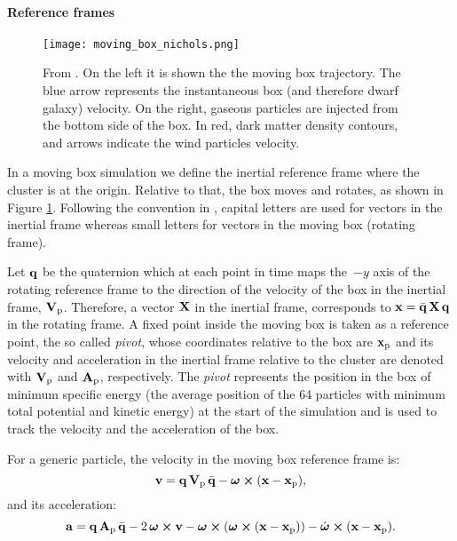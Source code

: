 \paragraph{Reference frames}
\begin{figure}[H]
 \centering
 \texttt{[image: moving\_box\_nichols.png]}
 \caption{From \citet{Nichols2015}. On the left it is shown the the moving box trajectory. The blue arrow represents the instantaneous box (and therefore dwarf galaxy) velocity.
 On the right, gaseous particles are injected from the bottom side of the box. In red, dark matter density contours, and arrows indicate the wind particles velocity.}
 \label{fig:mb_nichols}
\end{figure}
In a moving box simulation we define the inertial reference frame where the cluster is at the origin.
Relative to that, the box moves and rotates, as shown in Figure \ref{fig:mb_nichols}.
Following the convention in \citet{Nichols2015}, capital letters are used for vectors in the inertial frame whereas small letters for vectors in the moving box (rotating frame).

Let $\mathbf{q}$ be the quaternion which at each point in time maps the~$-y$ axis of the rotating reference frame to the direction of the velocity of the box in the inertial frame, $\boldsymbol{\mathbf{V}}_{\mathrm p}$.
Therefore, a vector $\boldsymbol{\mathbf{X}}$ in the inertial frame, corresponds to $\boldsymbol{\mathbf{x}} = \bar{\mathbf{q}}\, \boldsymbol{\mathbf{X}} \,\mathbf{q} $ in the rotating frame.
A fixed point inside the moving box is taken as a reference point, the so called \emph{pivot}, whose coordinates relative to the box are $\boldsymbol{\mathbf{x}}_{\mathrm p}$ and its velocity and acceleration in the inertial frame relative to the cluster are denoted with $\boldsymbol{\mathbf{V}}_{\mathrm p}$ and $\boldsymbol{\mathbf{A}}_{\mathrm p}$, respectively.
The \emph{pivot} represents the position in the box of minimum specific energy (the average position of the 64 particles with minimum total potential and kinetic energy) at the start of the simulation and is used to track the velocity and the acceleration of the box.

For a generic particle, the velocity in the moving box reference frame is:
\begin{equation}
 \label{eq:mb_velocity}
 \boldsymbol{\mathbf{v}} = \mathbf{q} \,\boldsymbol{\mathbf{V}}_{\mathrm p}\, \bar{\mathbf{q}} - \boldsymbol{\mathbf{\omega}}\cross(\boldsymbol{\mathbf{x}} -\boldsymbol{\mathbf{x}}_{\mathrm p}),
\end{equation}
and its acceleration:
\begin{equation}
 \label{eq:mb_acceleration}
 \boldsymbol{\mathbf{a}} = \mathbf{q} \,\boldsymbol{\mathbf{A}}_{\mathrm p}\, \bar{\mathbf{q}} - 2\,\boldsymbol{\mathbf{\omega}} \cross \boldsymbol{\mathbf{v}} - \boldsymbol{\mathbf{\omega}} \cross ( \boldsymbol{\mathbf{\omega}} \cross (\boldsymbol{\mathbf{x}}-\boldsymbol{\mathbf{x}}_{\mathrm p})) - \dot{\boldsymbol{\mathbf{\omega}}}\cross(\boldsymbol{\mathbf{x}} -\boldsymbol{\mathbf{x}}_{\mathrm p}).
\end{equation}


